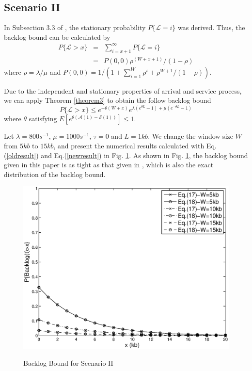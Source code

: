 \documentclass[paper]{ieice}
\begin{document}
\subsection{Scenario II}\label{scenario2}
In Subsection 3.3 of \cite{jung1996analysis}, the stationary probability $P\{\mathcal{L}=i\}$ was derived. Thus, the backlog bound can be calculated by
\begin{eqnarray}\label{oldresult}
P\{\mathcal{L}>x\}&=&\sum_{i=x+1}^\infty P\{\mathcal{L}=i\}\nonumber\\
&=& P(0,0)\rho^{(W+x+1)}/(1-\rho)
\end{eqnarray}
where $\rho=\lambda/\mu$ and $P(0,0)=1/(1+\sum_{i=1}^W\rho^i+\rho^{W+1}/(1-\rho))$.

Due to the independent and stationary properties of arrival and service process, we can apply Theorem \ref{theorem3} to obtain the follow backlog bound
\begin{equation}\label{newresult}
P\{\mathcal{L}>x\}\leq e^{-\theta(W+x)}e^{\lambda(e^{\theta L}-1)+\mu(e^{-\theta L}-1)}
\end{equation}
where $\theta$ satisfying $E[e^{\theta(\mathcal{A}(1)-\mathcal{S}(1))}]\leq 1$.

Let $\lambda=800s^{-1}$, $\mu=1000s^{-1}$, $\tau=0$ and $L=1kb$. We change the window size $W$ from $5kb$ to $15kb$, and present the numerical results calculated with Eq.(\ref{oldresult}) and Eq.(\ref{newresult}) in Fig. \ref{result3}. As shown in Fig. \ref{result3}, the backlog bound given in this paper is as tight as that given in \cite{jung1996analysis}, which is also the exact distribution of the backlog bound.
\begin{figure}
  \centering
  \includegraphics[scale=0.45]{figures/backlogcomp.eps}\\
  \caption{Backlog Bound for Scenario II}\label{result3}
\end{figure}
\end{document}
